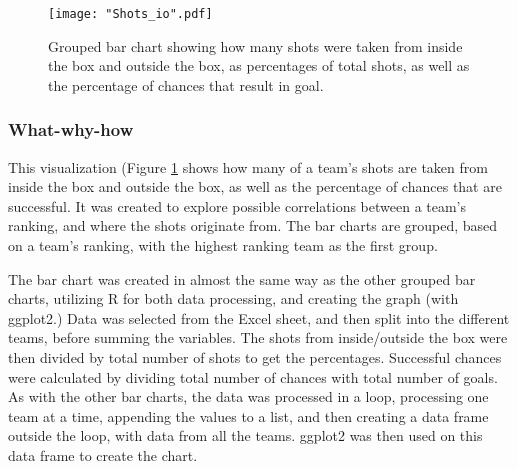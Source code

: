 \documentclass[Report.tex]{subfiles}
\begin{document}
\begin{figure}
\center
\texttt{[image: "Shots\_io".pdf]}
\caption{Grouped bar chart showing how many shots were taken from inside the
box and outside the box, as percentages of total shots, as well as the
percentage of chances that result in goal.}
\label{Fig:Shots_IO} 
\end{figure}

\subsubsection{What-why-how}
This visualization (Figure \ref{Fig:Shots_IO} shows how many of a team's shots are taken from inside the
box and outside the box, as well as the percentage of chances that are successful.
It was created to explore possible correlations between a team's ranking, and
where the shots originate from. 
The bar charts are grouped, based on a team's ranking, with the highest ranking
team as the first group. 

The bar chart was created in almost the same way as the other grouped bar
charts, utilizing R for both data processing, and creating the graph (with
ggplot2.)
Data was selected from the Excel sheet, and then split into the different teams,
before summing the variables. The shots from inside/outside the box were then
divided by total number of shots to get the percentages. Successful chances were
calculated by dividing total number of chances with total number of goals.
As with the other bar charts, the data was processed in a loop, processing one
team at a time, appending the values to a list, and then creating a data frame
outside the loop, with data from all the teams. ggplot2 was then used on this
data frame to create the chart.
\end{document}
